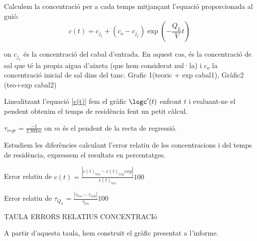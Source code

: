 \documentclass[10pt, twoside]{article}
\begin{document}
Calculem la concentració per a cada temps mitjançant l'equació proporcionada al guió:
\begin{equation}
    c(t) = c_{j_1} + (c_o-c_{j_1})\exp\left(-\frac{Q_L}{V}t\right) 
    \label{c(t)}   
\end{equation}

on $c_{j_1}$ és la concentració del cabal d'entrada. En aquest cas, és la concentració de sal que té la propia aigua d'aixeta (que hem considerat nul·la) i $c_o$ la concentració inicial de sal dins del tanc.
Grafic 1(teoric + exp cabal1), Gràfic2 (teo+exp cabal2)

Linealitzant l'equació \eqref{c(t)} fem el gràfic $\logc'(t)$ enfront $t$ i evaluant-ne el pendent obtenim el temps de residència fent un petit càlcul.

$\tau_{regr} = \frac{-1}{2.303m}$ on $m$ és el pendent de la recta de regressió.

Estudiem les diferències calculant l'error relatiu de les concentracions i del temps de residència, expressem el resultats en percentatges.

Error  relatiu  de  $c(t) = \frac{|c(t)_{teo} - c(t)_{exp} exp|}{c(t)_{teo}} 100$

Error relatiu de $\tau_{Q_L} = \frac{|\tau_{teo} - \tau_{exp}|}{\tau_{teo}} 100$

TAULA ERRORS RELATIUS CONCENTRACIó

A partir d'aquesta taula, hem construit el gràfic presentat a l'informe.
\end{document}
